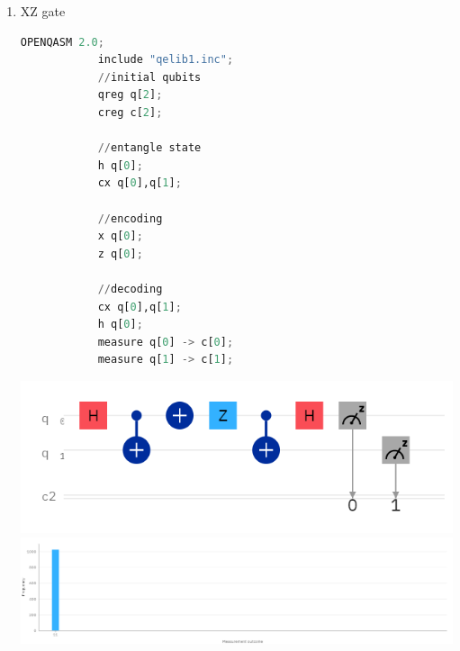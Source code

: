 \documentclass[12pt, a4paper]{article}
\begin{document}
\begin{enumerate}
		\newpage
		\item XZ gate
		
		\begin{lstlisting}[language=Python, caption= Superdense Coding (XZ-gate)]
			OPENQASM 2.0;
			include "qelib1.inc";
			//initial qubits
			qreg q[2];
			creg c[2];
			
			//entangle state
			h q[0];
			cx q[0],q[1];
			
			//encoding
			x q[0];
			z q[0];
			
			//decoding
			cx q[0],q[1];
			h q[0];
			measure q[0] -> c[0];
			measure q[1] -> c[1];
		\end{lstlisting}
		\includegraphics[scale=0.5]{circuit-xz.png}
		\includegraphics[scale=0.3]{bar-xz.png}
	\end{enumerate}
\end{document}
